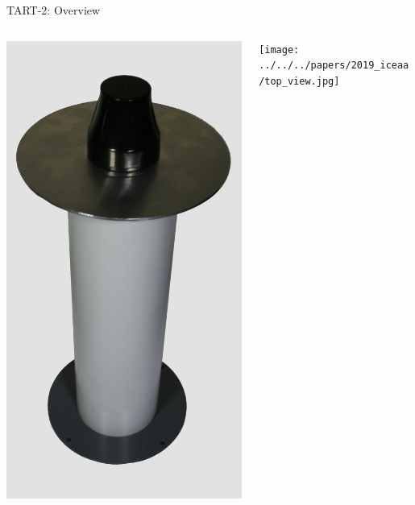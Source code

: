 \documentclass[ignorenonframetext]{beamer}
\begin{document}
\begin{frame}{TART-2: Overview}
\begin{columns}
\begin{column}{0.4\linewidth}
\begin{center}
  \includegraphics[height=0.4\textheight]{fig/antenna.jpg}
  \end{center}
  \end{column}
  \begin{column}{0.6\linewidth}
   \texttt{[image: ../../../papers/2019\_iceaa/top\_view.jpg]}
  \end{column}
 \end{columns}
\end{frame}
\end{document}
